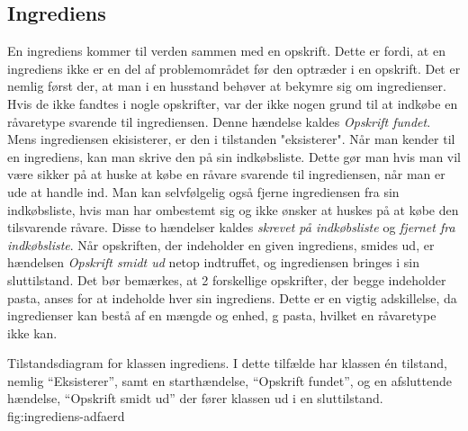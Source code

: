 \subsection{Ingrediens}

En ingrediens kommer til verden sammen med en opskrift. Dette er fordi, at en ingrediens ikke er en del af problemområdet før den optræder i en opskrift. Det er nemlig først der, at man i en husstand behøver at bekymre sig om ingredienser. Hvis de ikke fandtes i nogle opskrifter, var der ikke nogen grund til at indkøbe en råvaretype svarende til ingrediensen. Denne hændelse kaldes \textit{Opskrift fundet}. Mens ingrediensen ekisisterer, er den i tilstanden "eksisterer". Når man kender til en ingrediens, kan man skrive den på sin indkøbsliste. Dette gør man hvis man vil være sikker på at huske at købe en råvare svarende til ingrediensen, når man er ude at handle ind. Man kan selvfølgelig også fjerne ingrediensen fra sin indkøbsliste, hvis man har ombestemt sig og ikke ønsker at huskes på at købe den tilsvarende råvare. Disse to hændelser kaldes \textit{skrevet på indkøbsliste} og \textit{fjernet fra indkøbsliste}. Når opskriften, der indeholder en given ingrediens, smides ud, er hændelsen \textit{Opskrift smidt ud} netop indtruffet, og ingrediensen bringes i sin sluttilstand. Det bør bemærkes, at 2 forskellige opskrifter, der begge indeholder pasta, anses for at indeholde hver sin ingrediens. Dette er en vigtig adskillelse, da ingredienser kan bestå af en mængde og enhed,  g pasta, hvilket en råvaretype ikke kan.

  {Tilstandsdiagram for klassen ingrediens. I dette tilfælde har klassen én tilstand, nemlig ``Eksisterer'', samt en starthændelse, ``Opskrift fundet'', og en afsluttende hændelse, ``Opskrift smidt ud'' der fører klassen ud i en sluttilstand.}
  {fig:ingrediens-adfaerd}
